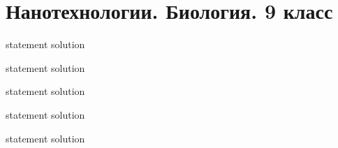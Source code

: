 \chapter{Нанотехнологии. Биология. 9 класс}

{statement}
{solution}

{statement}
{solution}

{statement}
{solution}

{statement}
{solution}

{statement}
{solution}